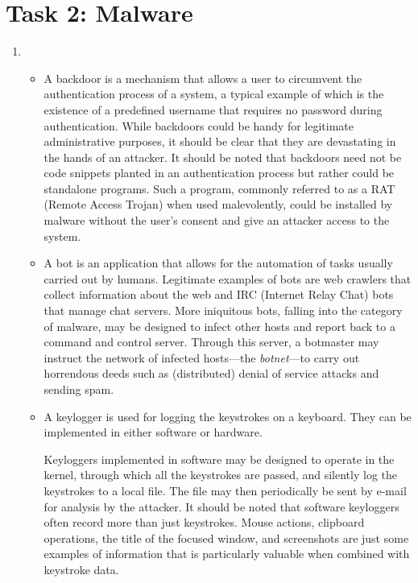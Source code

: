 \section*{Task 2: Malware}
\begin{enumerate}
\item %
  \begin{itemize}
  \item A backdoor is a mechanism that allows a user to circumvent the authentication process of a system, a typical example of which is the existence of a predefined username that requires no password during authentication. While backdoors could be handy for legitimate administrative purposes, it should be clear that they are devastating in the hands of an attacker. It should be noted that backdoors need not be code snippets planted in an authentication process but rather could be standalone programs. Such a program, commonly referred to as a RAT (Remote Access Trojan) when used malevolently, could be installed by malware without the user's consent and give an attacker access to the system.\cite{aycock06}
  \item
    A bot is an application that allows for the automation of tasks usually carried out by humans. Legitimate examples of bots are web crawlers that collect information about the web and IRC (Internet Relay Chat) bots that manage chat servers\cite{cisco_difference}. More iniquitous bots, falling into the category of malware, may be designed to infect other hosts and report back to a command and control server. Through this server, a botmaster may instruct the network of infected hosts---the \textit{botnet}---to carry out horrendous deeds such as (distributed) denial of service attacks and sending spam\cite{cisco_botnets}.
  \item
    A keylogger is used for logging the keystrokes on a keyboard. They can be implemented in either software or hardware.

Keyloggers implemented in software may be designed to operate in the kernel, through which all the keystrokes are passed, and silently log the keystrokes to a local file. The file may then periodically be sent by e-mail for analysis by the attacker\cite{wikipedia_keylogger}. It should be noted that software keyloggers often record more than just keystrokes. Mouse actions, clipboard operations, the title of the focused window, and screenshots are just some examples of information that is particularly valuable when combined with keystroke data\cite{sagiroglu09}.


\end{itemize}
\end{enumerate}
